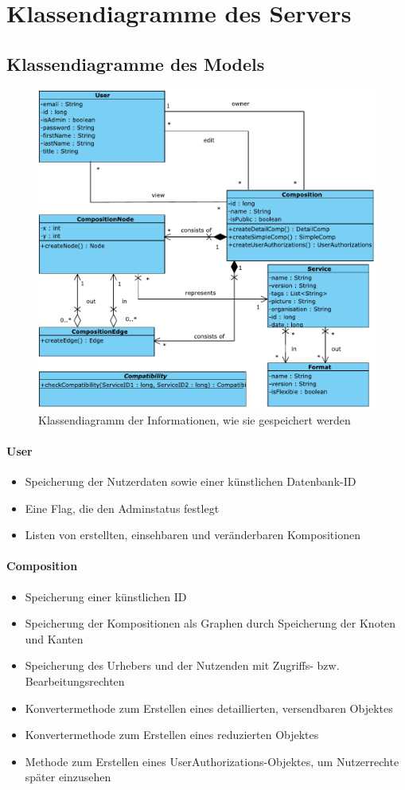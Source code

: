 

\section*{Klassendiagramme des Servers}

\subsection*{Klassendiagramme des Models}
\begin{figure}[!h]
	\centering
	\includegraphics[width=.75\textwidth]{img/Diagramme/Klassen/PureModel}
	\caption{Klassendiagramm der Informationen, wie sie gespeichert werden}
	\label{fig:klassendiagramm-model}
\end{figure}

\paragraph{User}
\begin{itemize}
		\item Speicherung der Nutzerdaten sowie einer künstlichen Datenbank-ID
		\item Eine Flag, die den Adminstatus festlegt
		\item Listen von erstellten, einsehbaren und veränderbaren Kompositionen
\end{itemize}

\paragraph{Composition}
\begin{itemize}
	\item Speicherung einer künstlichen ID
	\item Speicherung der Kompositionen als Graphen durch Speicherung der Knoten und Kanten
	\item Speicherung des Urhebers und der Nutzenden mit Zugriffs- bzw. Bearbeitungsrechten
	\item Konvertermethode zum Erstellen eines detaillierten, versendbaren Objektes
	\item Konvertermethode zum Erstellen eines reduzierten Objektes
	\item Methode zum Erstellen eines UserAuthorizations-Objektes, um Nutzerrechte später einzusehen
\end{itemize} 

